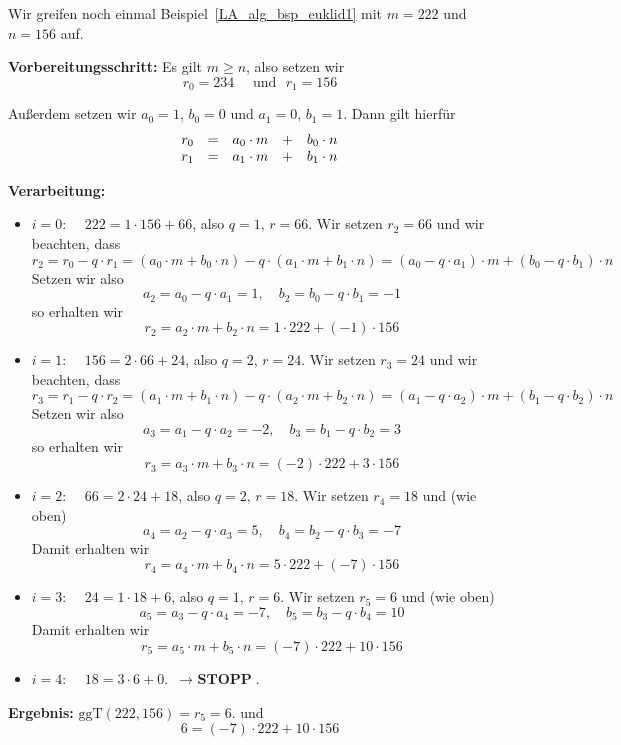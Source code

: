 \begin{beispiel}
Wir greifen noch einmal Beispiel~\ref{LA_alg_bsp_euklid1} mit $m = 222$ und $n = 156$ auf. 

\textbf{Vorbereitungsschritt:} Es gilt $m \geq n$, also setzen wir 
	$$ r_0 = 234 \quad \text{ und } \, \, r_1 = 156 $$

Außerdem setzen wir $a_0 = 1$, $b_0 = 0$ und $a_1 = 0$, $b_1 = 1$. Dann gilt hierfür 
	$$ \begin{array} {l c r c r}
	r_0 & = & a_0 \cdot m & + & b_0 \cdot n \\
	r_1 & = & a_1 \cdot m & + & b_1 \cdot n 
	\end{array} $$

\textbf{Verarbeitung:}

\begin{itemize}
\item[ ]$i = 0$: $\quad 222 = 1 \cdot 156 + 66$, also $q = 1$, $ r = 66$. Wir setzen $r_2 = 66$ und wir beachten, 
dass
	$$ r_2 = r_0 - q \cdot r_1 = (a_0 \cdot m + b_0 \cdot n) - q \cdot (a_1 \cdot m + b_1 \cdot n) 
	= (a_0 - q \cdot a_1) \cdot m + (b_0 - q \cdot b_1) \cdot n $$
Setzen wir also 
	$$ a_2 = a_0 - q \cdot a_1 = 1, \quad b_2 = b_0 - q \cdot b_1 = - 1 $$ 
so erhalten wir 
	$$ r_2 = a_2 \cdot m + b_2 \cdot n = 1 \cdot 222 + (-1) \cdot 156 $$
\item[ ]$i = 1$: $\quad 156 = 2 \cdot 66 + 24$, also $q = 2$, $r = 24$. Wir setzen $r_3 = 24$ und wir beachten, 
dass
	$$ r_3 = r_1 - q \cdot r_2 = (a_1 \cdot m + b_1 \cdot n) - q \cdot (a_2 \cdot m + b_2 \cdot n) 
	= (a_1 - q \cdot a_2) \cdot m + (b_1 - q \cdot b_2) \cdot n $$
Setzen wir also 
	$$ a_3 = a_1 - q \cdot a_2 = -2, \quad b_3 = b_1 - q \cdot b_2 = 3 $$ 
so erhalten wir 
	$$ r_3 = a_3 \cdot m + b_3 \cdot n = (-2) \cdot 222 + 3 \cdot 156 $$
\item[ ]$i = 2$: $\quad 66 = 2 \cdot 24 + 18$, also $q = 2$, $r = 18$. Wir setzen $r_4 = 18$ und (wie oben) 
	$$ a_4 = a_2 - q \cdot a_3 = 5, \quad b_4 = b_2 - q \cdot b_3 = -7 $$ 
Damit erhalten wir 
	$$ r_4 = a_4 \cdot m + b_4 \cdot n = 5 \cdot 222 + (-7) \cdot 156 $$
\item[ ]$i = 3$: $\quad 24 = 1 \cdot 18 + 6$, also $q = 1$, $r = 6$. Wir setzen $r_5 = 6$ und (wie oben) 
	$$ a_5 = a_3 - q \cdot a_4 = -7, \quad b_5 = b_3 - q \cdot b_4 = 10 $$ 
Damit erhalten wir 
	$$ r_5 = a_5 \cdot m + b_5 \cdot n = (-7) \cdot 222 + 10 \cdot 156 $$
\item[ ]$i = 4$: $\quad 18 = 3 \cdot 6 + 0$. $\, \longrightarrow \textbf{ STOPP}$.
\end{itemize}

\textbf{Ergebnis:} $\textrm{ggT}(222, 156) = r_5 = 6$. und 
	$$ 6 = (-7) \cdot 222 + 10 \cdot 156 $$
\end{beispiel}


